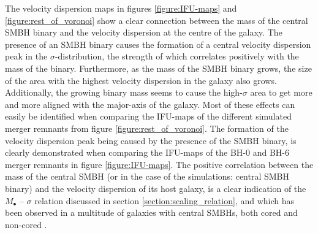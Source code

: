 \documentclass[english, twoside]{HYgradu}
\begin{document}
The velocity dispersion maps in figures \ref{figure:IFU-maps} and \ref{figure:rest_of_voronoi} show a clear connection between the mass of the central SMBH binary and the velocity dispersion at the centre of the galaxy. The presence of an SMBH binary causes the formation of a central velocity dispersion peak in the $\sigma$-distribution, the strength of which correlates positively with the mass of the binary. Furthermore, as the mass of the SMBH binary grows, the size of the area with the highest velocity dispersion in the galaxy also grows. Additionally, the growing binary mass seems to cause the high-$\sigma$ area to get more and more aligned with the major-axis of the galaxy. Most of these effects can easily be identified when comparing the IFU-maps of the different simulated merger remnants from figure \ref{figure:rest_of_voronoi}. The formation of the velocity dispersion peak being caused by the presence of the SMBH binary, is clearly demonstrated when comparing the IFU-maps of the BH-0 and BH-6 merger remnants in figure \ref{figure:IFU-maps}. The positive correlation between the mass of the central SMBH (or in the case of the simulations: central SMBH binary) and the velocity dispersion of its host galaxy, is a clear indication of the $M_\bullet$ – $\sigma$ relation discussed in section \ref{section:scaling_relation}, and which has been observed in a multitude of galaxies with central SMBHs, both cored and non-cored \citep{Ferrarese2000}.
\end{document}

